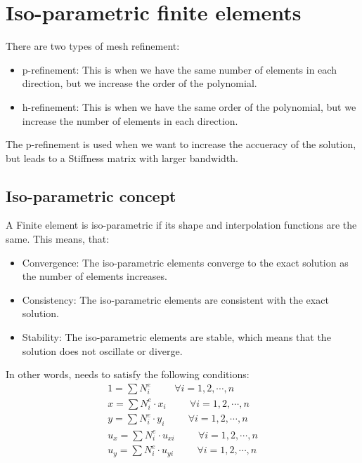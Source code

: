 \documentclass{article}  %
\begin{document}
\section{Iso-parametric finite elements}
There are two types of mesh refinement:
\begin{itemize}
    \item p-refinement: This is when we have the same number of elements in each direction, but we increase the order of the polynomial.
    \item h-refinement: This is when we have the same order of the polynomial, but we increase the number of elements in each direction.
\end{itemize}

The p-refinement is used when we want to increase the accueracy of the solution, but leads to a Stiffness matrix with larger bandwidth.

\subsection{Iso-parametric concept}
A Finite element is iso-parametric if its shape and interpolation functions are the same. This means, that:
\begin{itemize}
  \item Convergence: The iso-parametric elements converge to the exact solution as the number of elements increases.
  \item Consistency: The iso-parametric elements are consistent with the exact solution.
  \item Stability: The iso-parametric elements are stable, which means that the solution does not oscillate or diverge.
\end{itemize}

In other words, needs to satisfy the following conditions:
\begin{align}
  1=\sum N_i^e \hspace{1cm} \forall i=1,2,\cdots,n \\
  x= \sum N_i^e \cdot x_i \hspace{1cm} \forall i=1,2,\cdots,n \\
  y= \sum N_i^e \cdot y_i \hspace{1cm} \forall i=1,2,\cdots,n \\
  u_x= \sum N_i^e \cdot u_{xi} \hspace{1cm} \forall i=1,2,\cdots,n \\
  u_y= \sum N_i^e \cdot u_{yi} \hspace{1cm} \forall i=1,2,\cdots,n \\
\end{align}
\newpage
\end{document}
